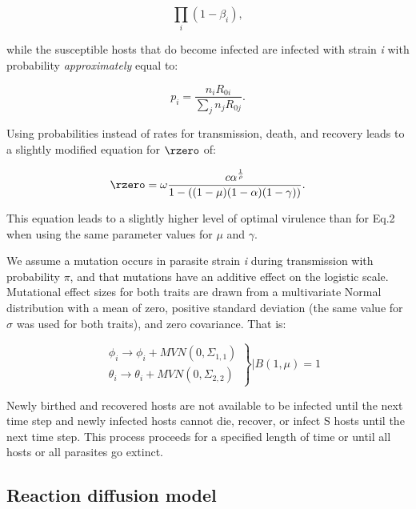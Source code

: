 \begin{equation*}
\prod_{i} (1 - \beta_{i}),
\end{equation*}

\noindent while the susceptible hosts that do become infected are infected with strain \emph{i} with probability \emph{approximately} equal to:

\begin{equation*}
p_{i} = \frac{n_{i}R_{0i}}{\sum_{j}n_{j}R_{0j}}.
\end{equation*}

Using probabilities instead of rates for transmission, death, and recovery leads to a slightly modified equation for $\rzero$ of:

\begin{equation}
\rzero = \omega \frac{c\alpha^{\frac{1}{\rho}}}{1 - ((1 - \mu)(1-\alpha)(1-\gamma))}.
\end{equation}

\noindent This equation leads to a slightly higher level of optimal virulence than for Eq.2 when using the same parameter values for $\mu$ and $\gamma$. 

We assume a mutation occurs in parasite strain \emph{i} during transmission with probability $\pi$, and that mutations have an additive effect on the logistic scale. Mutational effect sizes for both traits are drawn from a multivariate Normal distribution with a mean of zero, positive standard deviation (the same value for $\sigma$ was used for both traits), and zero covariance. That is:

\begin{equation*}
\left.\begin{matrix}
 & \phi_{i} \rightarrow \phi_{i} + MVN(0, \Sigma_{1,1})  \\ 
 & \theta_{i} \rightarrow \theta_{i} + MVN(0, \Sigma_{2,2}) 
\end{matrix}\right\} | B(1, \mu) = 1
\end{equation*}

Newly birthed and recovered hosts are not available to be infected until the next time step and newly infected hosts cannot die, recover, or infect S hosts until the next time step. This process proceeds for a specified length of time or until all hosts or all parasites go extinct. 

\subsection*{Reaction diffusion model}

